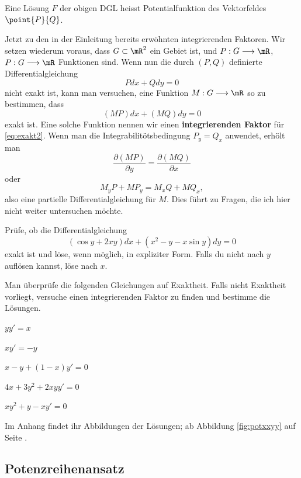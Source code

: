 \documentclass[%
11pt,%
twoside,%
titlepage,%
german,%
headsepline%
]{scrartcl}
\begin{document}
\begin{bem}
Eine L\"osung $F$ der obigen DGL heisst Potentialfunktion des Vektorfeldes $\point{P}{Q}$.
\end{bem}

Jetzt zu den in der Einleitung bereits erw\"ohnten integrierenden Faktoren. Wir setzen wiederum voraus, dass $G\subset\mR^2$ ein Gebiet ist, und $P:G\longrightarrow\mR$, $P:G\longrightarrow\mR$ Funktionen sind. Wenn nun die durch $(P,Q)$ definierte Differentialgleichung
\begin{equation}\label{eq:exakt2}
Pdx+Qdy=0
\end{equation}
nicht exakt ist, kann man versuchen, eine Funktion $M:G\longrightarrow\mR$ so zu bestimmen, dass
$$(MP)dx+(MQ)dy=0$$
exakt ist. Eine solche Funktion nennen wir einen \textbf{integrierenden Faktor} f\"ur \eqref{eq:exakt2}. Wenn man die Integrabilit\"otsbedingung $P_y=Q_x$ anwendet, erh\"olt man
$$\frac{\partial(MP)}{\partial y}=\frac{\partial(MQ)}{\partial x}$$
oder
$$M_yP+MP_y=M_xQ+MQ_x,$$
also eine partielle Differentialgleichung f\"ur $M$. Dies f\"uhrt zu Fragen, die ich hier nicht weiter untersuchen m\"ochte.

\begin{ueb}
Pr\"ufe, ob die Differentialgleichung
$$(\cos y+2xy)dx+(x^2-y-x\sin y)dy=0$$
exakt ist und l\"ose, wenn m\"oglich, in expliziter Form. Falls du nicht nach $y$ aufl\"osen kannst, l\"ose nach $x$.
\end{ueb}


\begin{ueb}
Man \"uberpr\"ufe die folgenden Gleichungen auf Exaktheit. Falls nicht Exaktheit vorliegt, versuche einen integrierenden Faktor zu finden und bestimme die L\"osungen.
\begin{enumeratea}
\item $yy'=x$
\item $xy'=-y$
\item $x-y+(1-x)y'=0$
\item $4x+3y^2+2xyy'=0$
\item $xy^2+y-xy'=0$
\end{enumeratea}
\end{ueb}

Im Anhang findet ihr Abbildungen der Lösungen; ab Abbildung \ref{fig:potxxyy} auf Seite \pageref{fig:potxxyy}.

\subsection{Potenzreihenansatz}
\end{document}
